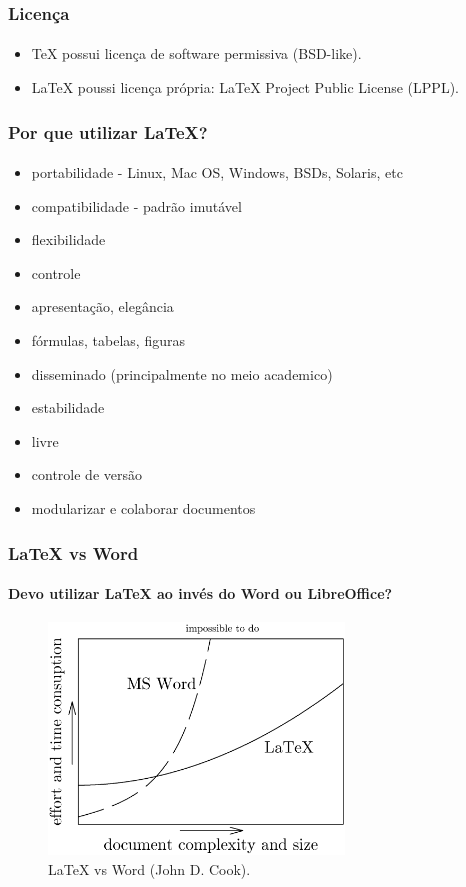\begin{frame}
\frametitle{Licença}
\framesubtitle{}
\begin{itemize}
  \item \TeX{} possui licença de software permissiva (BSD-like).
  \item \LaTeX{} poussi licença própria: \LaTeX{} Project Public License (LPPL).
\end{itemize}
\end{frame}


\begin{frame}
\frametitle{Por que utilizar \LaTeX{}?}
\framesubtitle{}
\begin{itemize}
  \item portabilidade - Linux, Mac OS, Windows, BSDs, Solaris, etc
  \item compatibilidade - padrão imutável
  \item flexibilidade
  \item controle
  \item apresentação, elegância
  \item fórmulas, tabelas, figuras
  \item disseminado (principalmente no meio academico)
  \item estabilidade
  \item livre
  \item controle de versão
  \item modularizar e colaborar documentos
\end{itemize}
\end{frame}

\begin{frame}
\frametitle{\LaTeX{} vs Word}
\framesubtitle{Devo utilizar \LaTeX{} ao invés do Word ou LibreOffice?}
  \begin{figure}[h!]
  \centering
  \includegraphics[width=0.7\textwidth]{figures/word_vs_latex.png}
  \caption{\LaTeX{} vs Word (John D. Cook).}
  \label{fig:word_vs_latex}
  \end{figure}
\end{frame}

